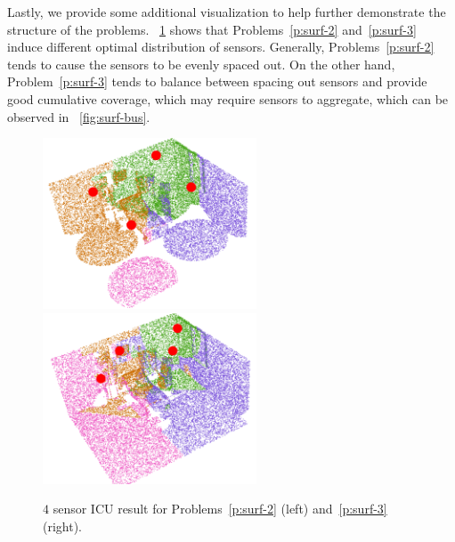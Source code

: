 
Lastly, we provide some additional visualization to help further demonstrate the structure of the problems. ~\ref{fig:surf-icu-comp} shows that Problems~\ref{p:surf-2} and~\ref{p:surf-3} induce different optimal distribution of sensors. Generally, Problems~\ref{p:surf-2} tends to cause the sensors to be evenly spaced out. On the other hand, Problem~\ref{p:surf-3} tends to balance between spacing out sensors and provide good cumulative coverage, which may require sensors to aggregate, which can be observed in ~\ref{fig:surf-bus}.

\begin{figure}[!ht]
\vspace{1mm}
    \centering
    \includegraphics[width = 0.35\columnwidth, height=2in]{chapters/surf/fig/icu-2-4.png}\hspace{3mm}
    \includegraphics[width = 0.35\columnwidth, height=2in]{chapters/surf/fig/icu-3-4.png}
\vspace{1mm}
    \caption{$4$ sensor ICU result for Problems~\ref{p:surf-2} (left) and~\ref{p:surf-3}(right).}
    \label{fig:surf-icu-comp}
\end{figure}

